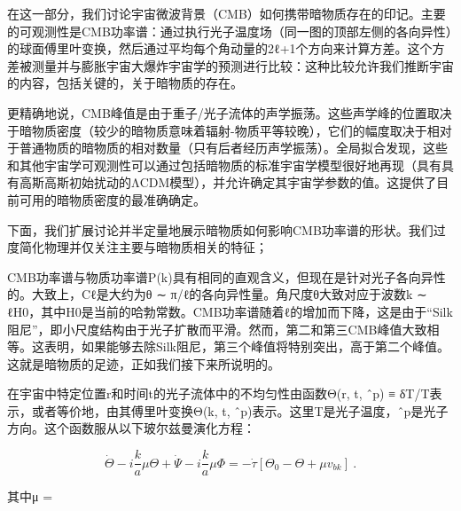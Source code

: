 


在这一部分，我们讨论宇宙微波背景（CMB）如何携带暗物质存在的印记。主要的可观测性是CMB功率谱：通过执行光子温度场（同一图的顶部左侧的各向异性）的球面傅里叶变换，然后通过平均每个角动量的2ℓ+1个方向来计算方差。这个方差被测量并与膨胀宇宙大爆炸宇宙学的预测进行比较：这种比较允许我们推断宇宙的内容，包括关键的，关于暗物质的存在。

更精确地说，CMB峰值是由于重子/光子流体的声学振荡。这些声学峰的位置取决于暗物质密度（较少的暗物质意味着辐射-物质平等较晚），它们的幅度取决于相对于普通物质的暗物质的相对数量（只有后者经历声学振荡）。全局拟合发现，这些和其他宇宙学可观测性可以通过包括暗物质的标准宇宙学模型很好地再现（具有具有高斯高斯初始扰动的ΛCDM模型），并允许确定其宇宙学参数的值。这提供了目前可用的暗物质密度的最准确确定。

下面，我们扩展讨论并半定量地展示暗物质如何影响CMB功率谱的形状。我们过度简化物理并仅关注主要与暗物质相关的特征； 

CMB功率谱与物质功率谱P(k)具有相同的直观含义，但现在是针对光子各向异性的。大致上，Cℓ是大约为θ ∼ π/ℓ的各向异性量。角尺度θ大致对应于波数k ∼ ℓH0，其中H0是当前的哈勃常数。CMB功率谱随着ℓ的增加而下降，这是由于“Silk阻尼”，即小尺度结构由于光子扩散而平滑。然而，第二和第三CMB峰值大致相等。这表明，如果能够去除Silk阻尼，第三个峰值将特别突出，高于第二个峰值。这就是暗物质的足迹，正如我们接下来所说明的。

在宇宙中特定位置r和时间t的光子流体中的不均匀性由函数Θ(r, t, ˆp) ≡ δT/T表示，或者等价地，由其傅里叶变换Θ(k, t, ˆp)表示。这里T是光子温度，ˆp是光子方向。这个函数服从以下玻尔兹曼演化方程：

\[ \dot{\Theta} - i \frac{k}{a}\mu  \Theta + \dot{\Psi} - i \frac{k}{a} \mu  \Phi = - \dot{\tau}[\Theta_0 - \Theta + \mu v_{b k}]~. \]

其中μ = 